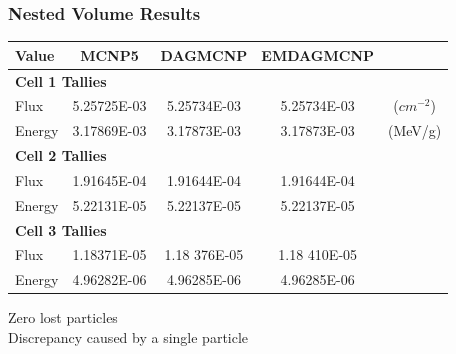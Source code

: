 \documentclass[12pt]{beamer}
\begin{document}
\begin{frame}
\begin{center}
\begin{tikzpicture}
\end{tikzpicture}
\end{center}

\end{frame}


\begin{frame}
\frametitle{Nested Volume Results}

\begin{table}
  \small
  \begin{center}
    \label{nestedspheres}
    \begin{tabular}{lcccc}
      \toprule
      Value & MCNP5 & DAGMCNP & EMDAGMCNP \\
      \toprule
      \multicolumn{4}{l}{\textbf{Cell 1 Tallies}} \\
      \hline
      Flux  & 5.25725E-03 & 5.25734E-03 & 5.25734E-03 & ($cm^{-2}$) \\
      Energy  & 3.17869E-03 &  3.17873E-03 &  3.17873E-03 & (MeV/g) \\
      \hline
      \multicolumn{4}{l}{\textbf{Cell 2 Tallies}} \\
      \hline
      Flux  & 1.91645E-04 & 1.91644E-04 & 1.91644E-04 \\
      Energy  & 5.22131E-05 & 5.22137E-05 & 5.22137E-05 \\
      \hline
      \multicolumn{4}{l}{\textbf{Cell 3 Tallies}} \\
      \hline
      Flux  & 1.18371E-05 & 1.18{\color{red} 376}E-05 & 1.18{\color{red} 410}E-05 \\
      Energy  & 4.96282E-06 & 4.96285E-06 & 4.96285E-06 \\
      \bottomrule
                        
    \end{tabular}
    \vfill
    Zero lost particles \\
    Discrepancy caused by a single particle \\

    
  \end{center}
\end{table}

\end{frame}
\end{document}
